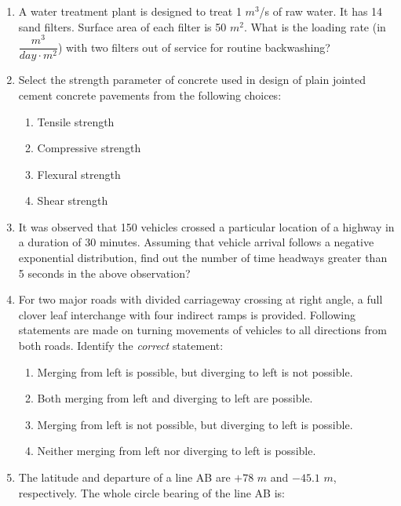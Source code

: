 \documentclass[journal,12pt,onecolumn]{IEEEtran}
\theoremstyle{remark}
\begin{document}
\begin{enumerate}
    \item A water treatment plant is designed to treat 1 $m^3$/s of raw water. It has 14 sand filters. Surface area of each filter is 50 $m^2$. What is the loading rate (in $\dfrac{m^3}{day \cdot m^2}$) with two filters out of service for routine backwashing? \underline{\hspace{2cm}}
\\
    \item Select the strength parameter of concrete used in design of plain jointed cement concrete pavements from the following choices:

    \begin{multicols}{2}
    \begin{enumerate}
        \item Tensile strength
        \item Compressive strength
        \item Flexural strength
        \item Shear strength
    \end{enumerate}
    \end{multicols}

    \item It was observed that 150 vehicles crossed a particular location of a highway in a duration of 30 minutes. Assuming that vehicle arrival follows a negative exponential distribution, find out the number of time headways greater than 5 seconds in the above observation? \underline{\hspace{2cm}}\\

    \item For two major roads with divided carriageway crossing at right angle, a full clover leaf interchange with four indirect ramps is provided. Following statements are made on turning movements of vehicles to all directions from both roads. Identify the \textit{correct} statement:
    
   
    \begin{enumerate}
        \item Merging from left is possible, but diverging to left is not possible.
        \item Both merging from left and diverging to left are possible.
        \item Merging from left is not possible, but diverging to left is possible.
        \item Neither merging from left nor diverging to left is possible.\\
    \end{enumerate} 
    \item The latitude and departure of a line AB are $+78$  $m$ and $-45.1$  $m$, respectively. The whole circle bearing of the line AB is:
    

\end{enumerate}
\end{document}
